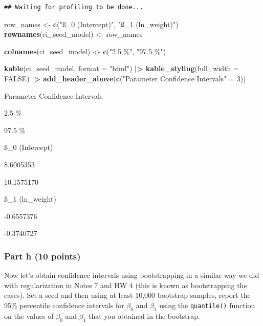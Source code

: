 \documentclass[
]{article}
\newenvironment{Shaded}{\begin{snugshade}}{\end{snugshade}}
\newcommand{\AttributeTok}[1]{\textcolor[rgb]{0.13,0.29,0.53}{#1}}
\newcommand{\ConstantTok}[1]{\textcolor[rgb]{0.56,0.35,0.01}{#1}}
\newcommand{\DecValTok}[1]{\textcolor[rgb]{0.00,0.00,0.81}{#1}}
\newcommand{\FunctionTok}[1]{\textcolor[rgb]{0.13,0.29,0.53}{\textbf{#1}}}
\newcommand{\NormalTok}[1]{#1}
\newcommand{\OtherTok}[1]{\textcolor[rgb]{0.56,0.35,0.01}{#1}}
\newcommand{\SpecialCharTok}[1]{\textcolor[rgb]{0.81,0.36,0.00}{\textbf{#1}}}
\newcommand{\StringTok}[1]{\textcolor[rgb]{0.31,0.60,0.02}{#1}}
\begin{document}
\begin{verbatim}
## Waiting for profiling to be done...
\end{verbatim}

\begin{Shaded}
\begin{Highlighting}[]
\NormalTok{row\_names }\OtherTok{\textless{}{-}} \FunctionTok{c}\NormalTok{(}\StringTok{"ß\_0 (Intercept)"}\NormalTok{, }\StringTok{"ß\_1 (ln\_weight)"}\NormalTok{)}
\FunctionTok{rownames}\NormalTok{(ci\_seed\_model) }\OtherTok{\textless{}{-}}\NormalTok{ row\_names}

\FunctionTok{colnames}\NormalTok{(ci\_seed\_model) }\OtherTok{\textless{}{-}} \FunctionTok{c}\NormalTok{(}\StringTok{"2.5 \%"}\NormalTok{, }\StringTok{"97.5 \%"}\NormalTok{)}

\FunctionTok{kable}\NormalTok{(ci\_seed\_model, }\AttributeTok{format =} \StringTok{"html"}\NormalTok{) }\SpecialCharTok{|\textgreater{}} 
  \FunctionTok{kable\_styling}\NormalTok{(}\AttributeTok{full\_width =} \ConstantTok{FALSE}\NormalTok{) }\SpecialCharTok{|\textgreater{}} 
  \FunctionTok{add\_header\_above}\NormalTok{(}\FunctionTok{c}\NormalTok{(}\StringTok{"Parameter Confidence Intervals"} \OtherTok{=} \DecValTok{3}\NormalTok{))}
\end{Highlighting}
\end{Shaded}

Parameter Confidence Intervals

2.5 \%

97.5 \%

ß\_0 (Intercept)

8.6005353

10.1575170

ß\_1 (ln\_weight)

-0.6557376

-0.3740727

\hypertarget{part-h-10-points}{%
\subsubsection{Part h (10 points)}\label{part-h-10-points}}

Now let's obtain confidence intervals using bootstrapping in a similar
way we did with regularization in Notes 7 and HW 4 (this is known as
bootstrapping the cases). Set a seed and then using at least 10,000
bootstrap samples, report the 95\% percentile confidence intervals for
\(\beta_0\) and \(\beta_1\) using the \texttt{quantile()} function on
the values of \(\beta_0\) and \(\beta_1\) that you obtained in the
bootstrap.
\end{document}

